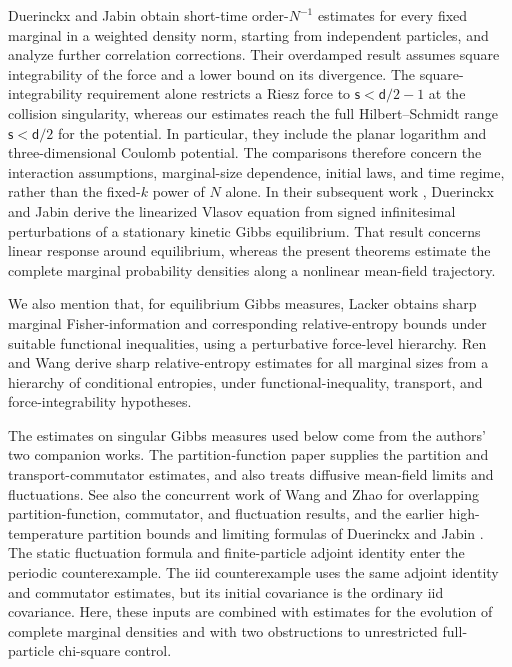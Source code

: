 \documentclass[11pt,reqno]{amsart}
\numberwithin{equation}{section}
\theoremstyle{plain}
\theoremstyle{remark}
\renewcommand{\d}{\mathsf{d}}\newcommand{\s}{\mathsf{s}}
\begin{document}
Duerinckx and Jabin \cite[Corollary 1.3(i) and Remark 1.2]{DJBrownian} obtain short-time order-$N^{-1}$ estimates for every fixed marginal in a weighted density norm, starting from independent particles, and analyze further correlation corrections. Their overdamped result assumes square integrability of the force and a lower bound on its divergence. The square-integrability requirement alone restricts a Riesz force to $\s<\d/2-1$ at the collision singularity, whereas our estimates reach the full Hilbert--Schmidt range $\s<\d/2$ for the potential. In particular, they include the planar logarithm and three-dimensional Coulomb potential. The comparisons therefore concern the interaction assumptions, marginal-size dependence, initial laws, and time regime, rather than the fixed-$k$ power of $N$ alone. In their subsequent work \cite[Theorem~1.1 and Appendix~A]{DJFluctuations}, Duerinckx and Jabin derive the linearized Vlasov equation from signed infinitesimal perturbations of a stationary kinetic Gibbs equilibrium. That result concerns linear response around equilibrium, whereas the present theorems estimate the complete marginal probability densities along a nonlinear mean-field trajectory.



We also mention that, for equilibrium Gibbs measures, Lacker \cite{LackerGibbs} obtains sharp marginal Fisher-information and corresponding relative-entropy bounds under suitable functional inequalities, using a perturbative force-level hierarchy. Ren and Wang \cite{RenWangGibbs} derive sharp relative-entropy estimates for all marginal sizes from a hierarchy of conditional entropies, under functional-inequality, transport, and force-integrability hypotheses.

The estimates on singular Gibbs measures used below come from the authors' two companion works. The partition-function paper \cite[Theorems 2.2 and 2.8]{DGRpartition} supplies the partition and transport-commutator estimates, and also treats diffusive mean-field limits and fluctuations. See also the concurrent work of Wang and Zhao \cite{WZ26} for overlapping partition-function, commutator, and fluctuation results, and the earlier high-temperature partition bounds and limiting formulas of Duerinckx and Jabin \cite[Theorem~2.1 and Proposition~2.2]{DJFluctuations}. The static fluctuation formula and finite-particle adjoint identity \cite[Propositions 2.11 and 8.2]{DGRpartition} enter the periodic counterexample. The iid counterexample uses the same adjoint identity and commutator estimates, but its initial covariance is the ordinary iid covariance. Here, these inputs are combined with estimates for the evolution of complete marginal densities and with two obstructions to unrestricted full-particle chi-square control.
\end{document}
